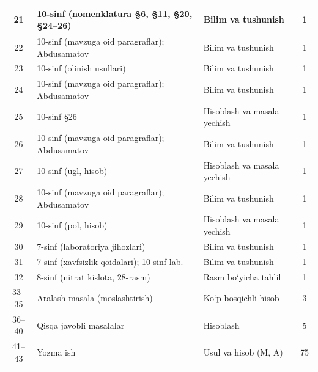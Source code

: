 \documentclass[11pt,a4paper]{article}
\begin{document}
{\begin{longtable}{|c|p{7.2cm}|p{5.4cm}|c|}
21 & 10-sinf (nomenklatura \S{}6, \S{}11, \S{}20, \S{}24--26) & Bilim va tushunish & 1\\\hline
22 & 10-sinf (mavzuga oid paragraflar); Abdusamatov & Bilim va tushunish & 1\\\hline
23 & 10-sinf (olinish usullari) & Bilim va tushunish & 1\\\hline
24 & 10-sinf (mavzuga oid paragraflar); Abdusamatov & Bilim va tushunish & 1\\\hline
25 & 10-sinf \S{}26 & Hisoblash va masala yechish & 1\\\hline
26 & 10-sinf (mavzuga oid paragraflar); Abdusamatov & Bilim va tushunish & 1\\\hline
27 & 10-sinf (ugl, hisob) & Hisoblash va masala yechish & 1\\\hline
28 & 10-sinf (mavzuga oid paragraflar); Abdusamatov & Bilim va tushunish & 1\\\hline
29 & 10-sinf (pol, hisob) & Hisoblash va masala yechish & 1\\\hline
30 & 7-sinf (laboratoriya jihozlari) & Bilim va tushunish & 1\\\hline
31 & 7-sinf (xavfsizlik qoidalari); 10-sinf lab. & Bilim va tushunish & 1\\\hline
32 & 8-sinf (nitrat kislota, 28-rasm) & Rasm bo`yicha tahlil & 1\\\hline
33--35 & Aralash masala (moslashtirish) & Ko`p bosqichli hisob & 3\\\hline
36--40 & Qisqa javobli masalalar & Hisoblash & 5\\\hline
41--43 & Yozma ish & Usul va hisob (M, A) & 75\\\hline
\end{longtable}}
\end{document}
